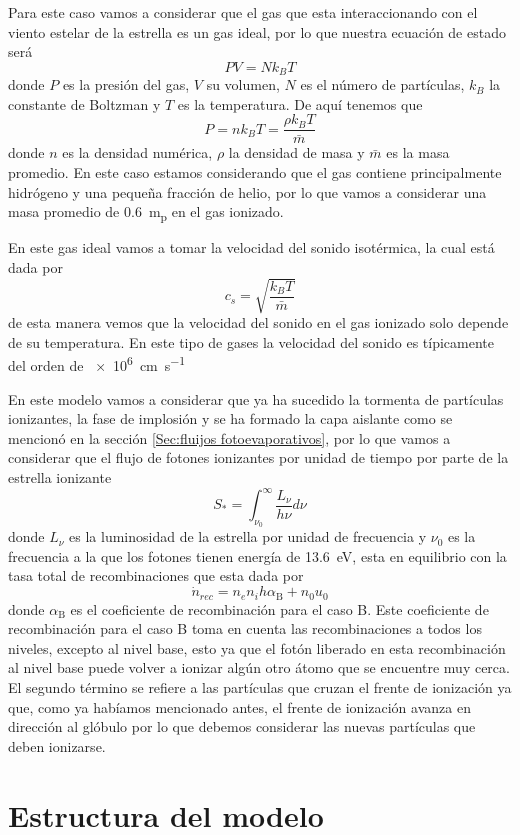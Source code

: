 \documentclass{book}
\begin{document}
Para este caso vamos a considerar que el gas que esta interaccionando con el viento estelar de la estrella es un gas ideal, por lo que nuestra ecuación de estado será
\[PV = Nk_BT\] donde $P$ es la presión del gas, $V$ su volumen, $N$ es el número de partículas, $k_B$ la constante de Boltzman y $T$ es la temperatura. De aquí tenemos que \[P = nk_BT = \frac{\rho k_B T}{\bar{m}}\] donde $n$ es la densidad numérica, $\rho$ la densidad de masa y $\bar{m}$ es la masa promedio. En este caso estamos considerando que el gas contiene principalmente hidrógeno y una pequeña fracción de helio, por lo que vamos a considerar una masa promedio de \SI{0.6}{m_{p}} en el gas ionizado.

En este gas ideal vamos a tomar la velocidad del sonido isotérmica, la cual está dada por
\[c_s  = \sqrt{\frac{k_B T}{\bar{m}}}\] de esta manera vemos que la velocidad del sonido en el gas ionizado solo depende de su temperatura. En este tipo de gases la velocidad del sonido es típicamente del orden de \SI{e6}{cm.s^{-1}}

En este modelo vamos a considerar que  ya ha sucedido la tormenta de partículas ionizantes, la fase de implosión y se ha formado la capa aislante como se mencionó en la sección \ref{Sec:fluijos fotoevaporativos}, por lo que vamos a considerar que el flujo de fotones ionizantes por unidad de tiempo por parte de la estrella ionizante 
\[S_* = \int_{\nu_0}^\infty \frac{L_\nu}{h\nu}d\nu\] donde $L_\nu$ es la luminosidad de la estrella por unidad de frecuencia y $\nu_0$ es la frecuencia a la que los fotones tienen energía de \SI{13.6}{eV}, esta en equilibrio con la tasa total de recombinaciones que esta dada por 
\[\dot{n}_{rec}=n_e n_i h \alpha_\mathrm{B}+n_0u_0\] donde $\alpha_\mathrm{B}$ es el coeficiente de recombinación para el caso B. Este coeficiente de recombinación para el caso B toma en cuenta las recombinaciones a todos los niveles, excepto al nivel base, esto ya que el fotón liberado en esta recombinación al nivel base puede volver a ionizar algún otro átomo que se encuentre muy cerca. El segundo término se refiere a las partículas que cruzan el frente de ionización ya que, como ya habíamos mencionado antes, el frente de ionización avanza en dirección al glóbulo por lo que debemos considerar las nuevas partículas que deben ionizarse. 

\section{Estructura del modelo}\label{Estructura}
\end{document}
